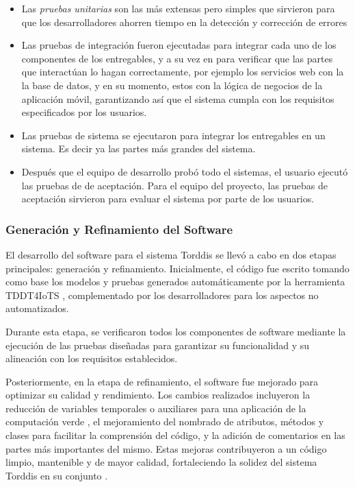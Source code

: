 \documentclass[a4paper,fleqn]{cas-sc}
\begin{document}
				\begin{itemize}
					\item Las \textit{pruebas unitarias} son las más extensas pero simples que sirvieron para que los desarrolladores ahorren tiempo en la detección y corrección de errores \citep{Mafi2024Regression}
					\item Las pruebas de integración fueron ejecutadas para integrar cada uno de los componentes de los entregables, y a su vez en para verificar que las partes que interactúan lo hagan correctamente, por ejemplo los servicios web con la la base de datos, y en su momento, estos con la lógica de negocios de la aplicación móvil, garantizando así que el sistema cumpla con los requisitos especificados por los usuarios.
					\item Las pruebas de sistema se ejecutaron para integrar los entregables en un sistema. Es decir ya las partes más grandes del sistema.
					\item Después que el equipo de desarrollo probó todo el sistemas, el usuario ejecutó las pruebas de de aceptación. Para el equipo del proyecto, las pruebas de aceptación sirvieron para evaluar el sistema por parte de los usuarios.
				\end{itemize}
				 
			\subsubsection{Generación y Refinamiento del Software} 
				El desarrollo del software para el sistema Torddis se llevó a cabo en dos etapas principales: generación y refinamiento. Inicialmente, el código fue escrito tomando como base los modelos y pruebas generados automáticamente por la herramienta TDDT4IoTS \citep{Guerrero2024Test}, complementado por los desarrolladores para los aspectos no automatizados. 
				
				Durante esta etapa, se verificaron todos los componentes de software mediante la ejecución de las pruebas diseñadas para garantizar su funcionalidad y su alineación con los requisitos establecidos.
			
				Posteriormente, en la etapa de refinamiento, el software fue mejorado para optimizar su calidad y rendimiento. Los cambios realizados incluyeron la reducción de variables temporales o auxiliares para una aplicación de la computación verde \citep{Firmansyah2024Integrating}, el mejoramiento del nombrado de atributos, métodos y clases para facilitar la comprensión del código, y la adición de comentarios en las partes más importantes del mismo. Estas mejoras contribuyeron a un código limpio, mantenible y de mayor calidad, fortaleciendo la solidez del sistema Torddis en su conjunto \citep{Marabesi2024Exploring}.
			
\end{document}
